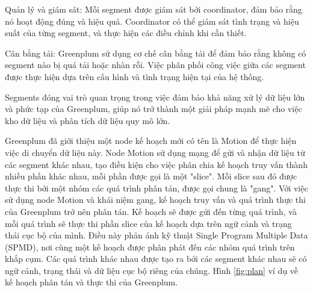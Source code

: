 \documentclass{article}[14pt]
\begin{document}
{Quản lý và giám sát:
Mỗi segment được giám sát bởi coordinator, đảm bảo rằng nó hoạt động đúng
và hiệu quả. Coordinator có thể giám sát tình trạng và hiệu suất của từng segment, và thực hiện các điều chỉnh khi cần thiết.

Cân bằng tải: Greenplum sử dụng cơ chế cân bằng tải để đảm bảo rằng không có segment nào bị quá tải hoặc nhàn rỗi.
Việc phân phối công việc giữa các segment được thực hiện dựa trên cấu hình và tình trạng hiện tại của hệ thống.

Segments đóng vai trò quan trọng trong việc đảm bảo khả năng xử lý dữ liệu lớn và phức tạp của Greenplum, giúp nó trở thành một giải pháp mạnh mẽ cho việc kho dữ liệu và phân tích dữ liệu quy mô lớn.

Greenplum đã giới thiệu một node kế hoạch mới có tên là Motion để thực hiện việc di chuyển dữ liệu này. Node Motion sử dụng mạng để gửi và nhận dữ liệu từ các segment khác nhau, tạo điều kiện cho việc phân chia kế hoạch truy vấn thành nhiều phần khác nhau, mỗi phần được gọi là một "slice". Mỗi slice sau đó được thực thi bởi một nhóm các quá trình phân tán, được gọi chung là "gang". Với việc sử dụng node Motion và khái niệm gang, kế hoạch truy vấn và quá trình thực thi của Greenplum trở nên phân tán. Kế hoạch sẽ được gửi đến từng quá trình, và mỗi quá trình sẽ thực thi phần slice của kế hoạch dựa trên ngữ cảnh và trạng thái cục bộ của mình. Điều này phản ánh kỹ thuật Single Program Multiple Data (SPMD), nơi cùng một kế hoạch được phân phát đến các nhóm quá trình trên khắp cụm. Các quá trình khác nhau được tạo ra bởi các segment khác nhau sẽ có ngữ cảnh, trạng thái và dữ liệu cục bộ riêng của chúng. Hình \ref{fig:plan} ví dụ về kế hoạch phân tán và thực thi của Greenplum.

}
\end{document}

